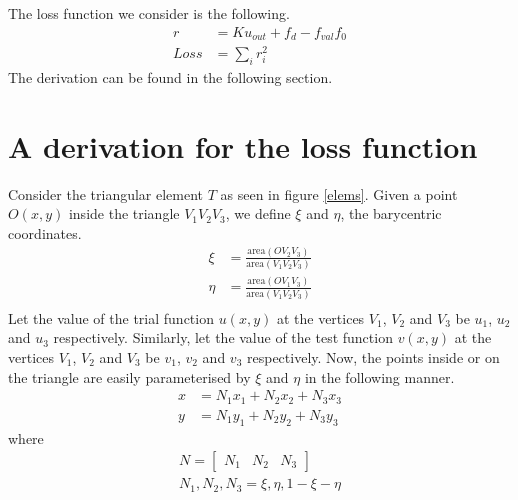 \documentclass{article}
\begin{document}
The loss function we consider is the following.
\begin{align*}
	r &= K u_{\mathit{out}} + f_d - f_{\mathit{val}} f_0 \\
	\mathit{Loss} &= \sum_i r_i^2
\end{align*}
The derivation can be found in the following section.

\section{A derivation for the loss function}

Consider the triangular element $T$
as seen in figure \ref{elems}.
Given a point $O(x,y)$ inside the triangle $V_1V_2V_3$,
we define $\xi$ and $\eta$,
the barycentric coordinates.
\begin{align*}
  \xi &= \frac{\text{area}(OV_2V_3)}{\text{area}(V_1V_2V_3)} \\
  \eta &= \frac{\text{area}(OV_1V_3)}{\text{area}(V_1V_2V_3)} \\
\end{align*}
Let the value of the trial function $u(x,y)$
at the vertices $V_1$, $V_2$ and $V_3$
be $u_1$, $u_2$ and $u_3$ respectively.
Similarly,
let the value of the test function $v(x,y)$
at the vertices $V_1$, $V_2$ and $V_3$
be $v_1$, $v_2$ and $v_3$ respectively.
Now, the points inside or on the triangle
are easily parameterised by $\xi$ and $\eta$
in the following manner.
\begin{align}
  x &= N_1 x_1 + N_2 x_2 + N_3 x_3 \label{x}\\
  y &= N_1 y_1 + N_2 y_2 + N_3 y_3 \label{y}
\end{align}
where
\begin{align*}
	N = \begin{bmatrix} N_1 & N_2 & N_3 \end{bmatrix} \\
	N_1, N_2, N_3 = \xi, \eta, 1 - \xi - \eta
\end{align*}
\end{document}
